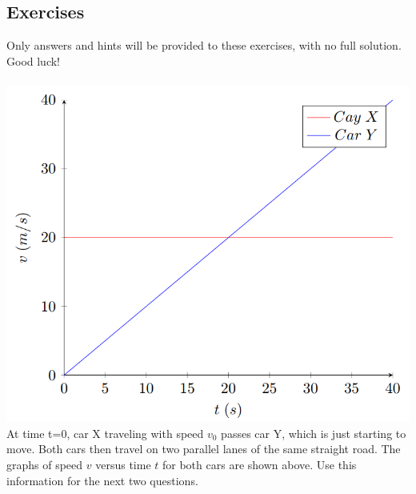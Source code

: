 


\newpage
\subsection*{Exercises}
Only answers and hints will be provided to these exercises, with no full solution. Good luck!\\\\




\includegraphics{Figures/Figure11}
\\
At time t=0, car X traveling with speed $v_0$ passes car Y, which is just starting to move. Both cars then travel on two parallel lanes of the same straight road. The graphs of speed $v$ versus time $t$ for both cars are shown above. Use this information for the next two questions.

